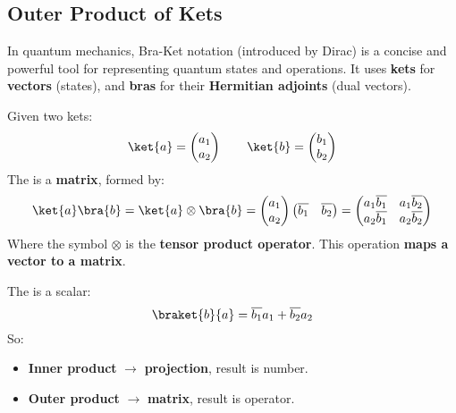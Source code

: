 \subsection{Outer Product of Kets}

In quantum mechanics, Bra-Ket notation (introduced by Dirac) is a concise and powerful tool for representing quantum states and operations. It uses \textbf{kets} \ket{\psi} for \textbf{vectors} (states), and \textbf{bras} \bra{\psi} for their \textbf{Hermitian adjoints} (dual vectors).

\highspace
Given two kets:
\begin{equation*}
    \ket{a} = \begin{pmatrix}
        a_{1} \\
        a_{2}
    \end{pmatrix}
    \hspace{2em}
    \ket{b} = \begin{pmatrix}
        b_{1} \\
        b_{2}
    \end{pmatrix}
\end{equation*}
The   is a \textbf{matrix}, formed by:
\begin{equation*}
    \ket{a}\bra{b} = \ket{a} \otimes \bra{b} = \begin{pmatrix}
        a_{1} \\
        a_{2}
    \end{pmatrix}
    \begin{pmatrix}
        \overline{b_{1}} & \overline{b_{2}}
    \end{pmatrix}
    =
    \begin{pmatrix}
        a_{1}\overline{b_{1}} & a_{1}\overline{b_{2}} \\
        a_{2}\overline{b_{1}} & a_{2}\overline{b_{2}}
    \end{pmatrix}
\end{equation*}
Where the symbol $\otimes$ is the \textbf{tensor product operator}. This operation \textbf{maps a vector to a matrix}.

\highspace
The   is a scalar:
\begin{equation*}
    \braket{b}{a} = \overline{b_{1}} a_{1} + \overline{b_{2}} a_{2}
\end{equation*}
So:
\begin{itemize}
    \item \textbf{Inner product} $\rightarrow$ \textbf{projection}, result is number.
    \item \textbf{Outer product} $\rightarrow$ \textbf{matrix}, result is operator.
\end{itemize}

